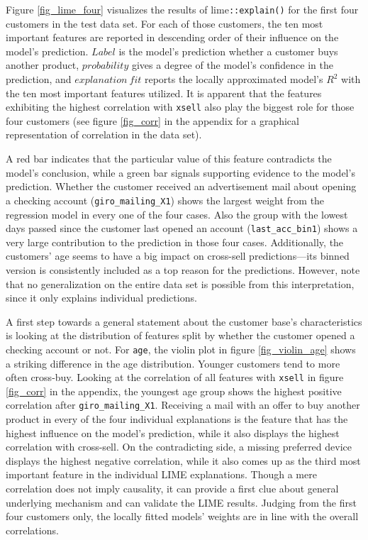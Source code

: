 \documentclass[12pt,a4paper]{article}
\newcommand{\pkg}[1]{{\normalfont\fontseries{b}\selectfont #1}}
\let\code=\texttt
\begin{document}
Figure \ref{fig_lime_four} visualizes the results of \pkg{lime}\code{::explain()} for the first four customers in the test data set.
For each of those customers, the ten most important features are reported in descending order of their influence on the model's prediction.
$Label$ is the model's prediction whether a customer buys another product, $probability$ gives a degree of the model's confidence in the prediction,
and $explanation\ fit$ reports the locally approximated model's $R^2$ with the ten most important features utilized.
It is apparent that the features exhibiting the highest correlation with \code{xsell} also play the biggest role for those four customers 
(see figure \ref{fig_corr} in the appendix for a graphical representation of correlation in the data set). 

A red bar indicates that the particular value of this feature contradicts the model's conclusion,
while a green bar signals supporting evidence to the model's prediction.
Whether the customer received an advertisement mail about opening a checking account (\code{giro\_mailing\_X1}) shows the largest weight from the regression model in every one of the four cases.
Also the group with the lowest days passed since the customer last opened an account (\code{last\_acc\_bin1}) shows a very large contribution to the 
prediction in those four cases.
Additionally, the customers' age seems to have a big impact on cross-sell predictions---its binned version is consistently included as a top reason for the predictions.
However, note that no generalization on the entire data set is possible from this interpretation, since it only explains individual predictions.

A first step towards a general statement about the customer base's characteristics is looking at the distribution of features split by whether the customer
opened a checking account or not.
For \code{age}, the violin plot in figure \ref{fig_violin_age} shows a striking difference in the age distribution.
Younger customers tend to more often cross-buy.
Looking at the correlation of all features with \code{xsell} in figure \ref{fig_corr} in the appendix, the youngest age group shows the highest positive correlation after \code{giro\_mailing\_X1}.
Receiving a mail with an offer to buy another product in every of the four individual explanations is the feature that has the highest influence on
the model's prediction, while it also displays the highest correlation with cross-sell.
On the contradicting side, a missing preferred device displays the highest negative correlation,
while it also comes up as the third most important feature in the individual LIME explanations.
Though a mere correlation does not imply causality, it can provide a first clue about general underlying mechanism and can validate the LIME results.
Judging from the first four customers only, the locally fitted models' weights are in line with the overall correlations.
\end{document}
